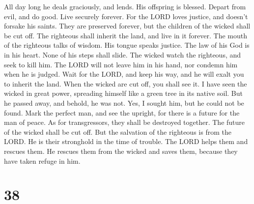  All day long he deals graciously, and lends. His
offspring is blessed.  Depart from evil, and do good.
Live securely forever.  For the LORD loves justice, and
doesn't forsake his saints. They are preserved forever, but the children
of the wicked shall be cut off.  The righteous shall
inherit the land, and live in it forever.  The mouth of
the righteous talks of wisdom. His tongue speaks justice.
 The law of his God is in his heart. None of his steps
shall slide.  The wicked watch the righteous, and seek to
kill him.  The LORD will not leave him in his hand, nor
condemn him when he is judged.  Wait for the LORD, and
keep his way, and he will exalt you to inherit the land. When the wicked
are cut off, you shall see it.  I have seen the wicked in
great power, spreading himself like a green tree in its native soil.
 But he passed away, and behold, he was not. Yes, I
sought him, but he could not be found.  Mark the perfect
man, and see the upright, for there is a future for the man of peace.
 As for transgressors, they shall be destroyed together.
The future of the wicked shall be cut off.  But the
salvation of the righteous is from the LORD. He is their stronghold in
the time of trouble.  The LORD helps them and rescues
them. He rescues them from the wicked and saves them, because they have
taken refuge in him.

\hypertarget{section-37}{%
\section{38}\label{section-37}}

